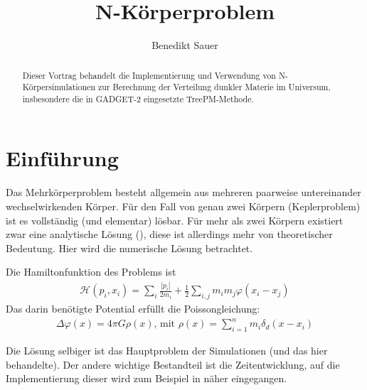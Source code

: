 \documentclass[a4paper]{scrartcl}
\author{Benedikt Sauer}
\title{N-Körperproblem}
\begin{document}
\maketitle
\begin{abstract}
  Dieser Vortrag behandelt die Implementierung und Verwendung von
  N-Körpersimulationen zur Berechnung der Verteilung dunkler Materie im
  Universum, insbesondere die in GADGET-2 eingesetzte TreePM-Methode.
\end{abstract}
\section{Einführung}
Das Mehrkörperproblem besteht allgemein aus mehreren paarweise untereinander
wechselwirkenden Körper. Für den Fall von genau zwei Körpern (Keplerproblem) ist
es vollständig (und elementar) lösbar. Für mehr als zwei Körpern existiert zwar
eine analytische Lösung (\cite{wang}), diese ist allerdings mehr von
theoretischer Bedeutung. Hier wird die numerische Lösung betrachtet.

Die Hamiltonfunktion des Problems ist
\begin{align}
  \mathcal{H}(p_i, x_i) = \sum_i \frac{\left|p_i\right|}{2m_i} +
  \frac{1}{2} \sum_{i,j} m_i m_j \varphi(x_i - x_j)
  \label{eq:hamilton}
\end{align}
Das darin benötigte Potential erfüllt die Poissongleichung:
\begin{align}
  \Delta \varphi(x) = 4\pi G \rho(x)\text{, mit }\rho(x) = \sum_{i=1}^n m_i
  \delta_d(x - x_i)
  \label{eq:poisson}
\end{align}

Die Lösung selbiger ist das Hauptproblem der Simulationen (und das hier
behandelte). Der andere wichtige Bestandteil ist die Zeitentwicklung, auf die
Implementierung dieser wird zum Beispiel in \cite{gadget-zeit} näher
eingegangen.
\end{document}
